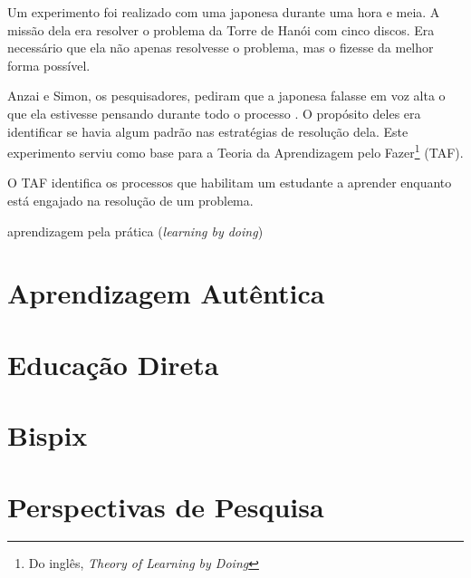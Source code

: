 \documentclass[12pt]{article}
\begin{document}
Um experimento foi realizado com uma japonesa durante uma hora e meia. A missão dela era resolver o problema da Torre de Hanói com cinco discos. Era necessário que ela não apenas resolvesse o problema, mas o fizesse da melhor forma possível.

Anzai e Simon, os pesquisadores, pediram que a japonesa falasse em voz alta o que ela estivesse pensando durante todo o processo \cite{anzai:1979}. O propósito deles era identificar se havia algum padrão nas estratégias de resolução dela. Este experimento serviu como base para a Teoria da Aprendizagem pelo Fazer\footnote{Do inglês, {\it Theory of Learning by Doing}} (TAF).

O TAF identifica os processos que habilitam um estudante a aprender enquanto está engajado na resolução de um problema.

aprendizagem pela prática ({\it learning by doing}) \cite{schank:1999, benssen:2015}

\section{Aprendizagem Autêntica} \label{sec:authentic}
\section{Educação Direta} \label{sec:direct}
\section{Bispix} \label{sec:bispix}
\section{Perspectivas de Pesquisa} \label{sec:perspectivas}




\end{document}
